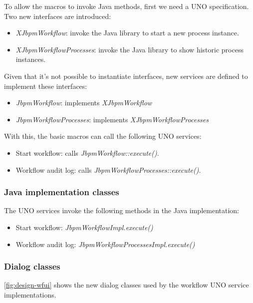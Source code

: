 To allow the macros to invoke Java methods, first we need a UNO specification.
Two new interfaces are introduced:

\begin{itemize}
\item \emph{XJbpmWorkflow}: invoke the Java library to start a new process instance.
\item \emph{XJbpmWorkflowProcesses}: invoke the Java library to show historic process instances.
\end{itemize}

Given that it's not possible to instantiate interfaces, new services are
defined to implement these interfaces:

\begin{itemize}
\item \emph{JbpmWorkflow}: implements \emph{XJbpmWorkflow}
\item \emph{JbpmWorkflowProcesses}: implements \emph{XJbpmWorkflowProcesses}
\end{itemize}

With this, the basic macros can call the following UNO services:

\begin{itemize}
\item Start workflow: calls \emph{JbpmWorkflow::execute()}.
\item Workflow audit log: calls \emph{JbpmWorkflowProcesses::execute()}.
\end{itemize}

\subsubsection*{Java implementation classes}

The UNO services invoke the following methods in the Java implementation:

\begin{itemize}
\item Start workflow: \emph{JbpmWorkflowImpl.execute()}
\item Workflow audit log: \emph{JbpmWorkflowProcessesImpl.execute()}
\end{itemize}

\subsubsection*{Dialog classes}

\autoref{fig:design-wfui} shows the new dialog classes used by the workflow
UNO service implementations.

